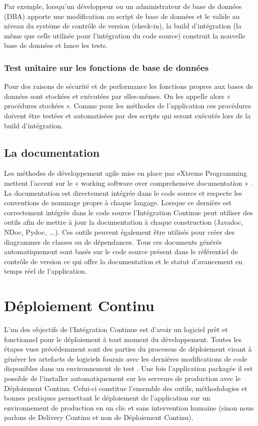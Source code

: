     Par exemple, lorsqu’un développeur ou un administrateur de base de données (\gls{DBA}) apporte une modification au script de base de données et le valide au niveau du système de contrôle de version (\gls{check-in}), la build d’intégration (la même que celle utilisée pour l’intégration du code source) construit la nouvelle base de données et lance les tests.

      \subsubsection{Test unitaire sur les fonctions de base de données}
      Pour des raisons de sécurité et de performance les fonctions propres aux bases de données sont stockées et exécutées par elles-mêmes. On les appelle alors « procédures stockées ». Comme pour les méthodes de l’application ces procédures doivent être testées et automatisées par des scripts qui seront exécutés lors de la build d’intégration.

    \subsection{La documentation}
    Les méthodes de développement agile mise en place par eXtreme Programming mettent l'accent sur le « working software over comprehensive documentation » \cite{HF01}. La documentation est directement intégrée dans le code source et respecte les conventions de nommage propre à chaque langage. Lorsque ce dernière est correctement intégrée dans le code source l'Intégration Continue peut utiliser des outils afin de mettre à jour la documentation à chaque construction (Javadoc, NDoc, Pydoc, ...). Ces outils peuvent également être utilisés pour créer des diagrammes de classes ou de dépendances. Tous ces documents générés automatiquement sont basés sur le code source présent dans le référentiel de contrôle de version ce qui offre la documentation et le statut d'avancement en temps réel de l'application.

  \section{Déploiement Continu}
  L'un des objectifs de l’Intégration Continue est d'avoir un logiciel prêt et fonctionnel pour le déploiement à tout moment du développement. Toutes les étapes vues précédemment sont des parties du processus de déploiement visant à générer les artefacts de logiciels fournis avec les dernières modifications de code disponibles dans un environnement de test \cite{Duv07}. Une fois l’application packagée il est possible de l'installer automatiquement sur les serveurs de production avec le Déploiement Continu. Celui-ci constitue l'ensemble des outils, méthodologies et bonnes pratiques permettant le déploiement de l'application sur un environnement de production en un clic et sans intervention humaine (sinon nous parlons de Delivery Continu et non de Déploiement Continu).

